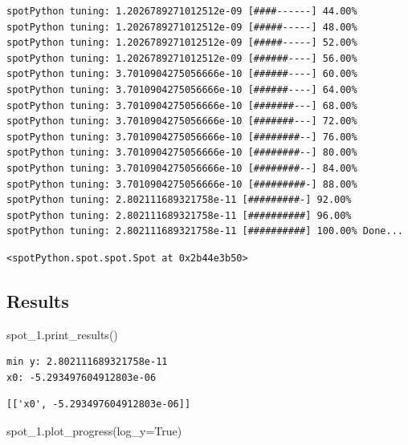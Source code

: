 \documentclass[
  letterpaper,
  DIV=11,
  numbers=noendperiod]{scrreprt}
\newenvironment{Shaded}{\begin{snugshade}}{\end{snugshade}}
\newcommand{\NormalTok}[1]{\textcolor[rgb]{0.00,0.23,0.31}{#1}}
\newcommand{\OperatorTok}[1]{\textcolor[rgb]{0.37,0.37,0.37}{#1}}
\newcommand{\VariableTok}[1]{\textcolor[rgb]{0.07,0.07,0.07}{#1}}
\begin{document}
\begin{verbatim}
spotPython tuning: 1.2026789271012512e-09 [####------] 44.00% 
spotPython tuning: 1.2026789271012512e-09 [#####-----] 48.00% 
spotPython tuning: 1.2026789271012512e-09 [#####-----] 52.00% 
spotPython tuning: 1.2026789271012512e-09 [######----] 56.00% 
spotPython tuning: 3.7010904275056666e-10 [######----] 60.00% 
spotPython tuning: 3.7010904275056666e-10 [######----] 64.00% 
spotPython tuning: 3.7010904275056666e-10 [#######---] 68.00% 
spotPython tuning: 3.7010904275056666e-10 [#######---] 72.00% 
spotPython tuning: 3.7010904275056666e-10 [########--] 76.00% 
spotPython tuning: 3.7010904275056666e-10 [########--] 80.00% 
spotPython tuning: 3.7010904275056666e-10 [########--] 84.00% 
spotPython tuning: 3.7010904275056666e-10 [#########-] 88.00% 
spotPython tuning: 2.802111689321758e-11 [#########-] 92.00% 
spotPython tuning: 2.802111689321758e-11 [##########] 96.00% 
spotPython tuning: 2.802111689321758e-11 [##########] 100.00% Done...
\end{verbatim}

\begin{verbatim}
<spotPython.spot.spot.Spot at 0x2b44e3b50>
\end{verbatim}

\subsection{Results}\label{results-6}

\begin{Shaded}
\begin{Highlighting}[]
\NormalTok{spot\_1.print\_results()}
\end{Highlighting}
\end{Shaded}

\begin{verbatim}
min y: 2.802111689321758e-11
x0: -5.293497604912803e-06
\end{verbatim}

\begin{verbatim}
[['x0', -5.293497604912803e-06]]
\end{verbatim}

\begin{Shaded}
\begin{Highlighting}[]
\NormalTok{spot\_1.plot\_progress(log\_y}\OperatorTok{=}\VariableTok{True}\NormalTok{)}
\end{Highlighting}
\end{Shaded}
\end{document}
